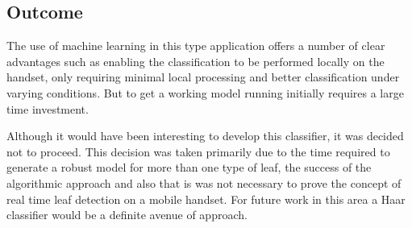 \subsection{Outcome}
The use of machine learning in this type application offers a number of clear advantages such as enabling the classification to be performed locally on the handset, only requiring minimal local processing and better classification under varying conditions. But to get a working model running initially requires a large time investment.

Although it would have been interesting to develop this classifier, it was decided not to proceed. This decision was taken primarily due to the time required to generate a robust model for more than one type of leaf, the success of the algorithmic approach and also that is was not necessary to prove the concept of real time leaf detection on a mobile handset. For future work in this area a Haar classifier would be a definite avenue of approach.

